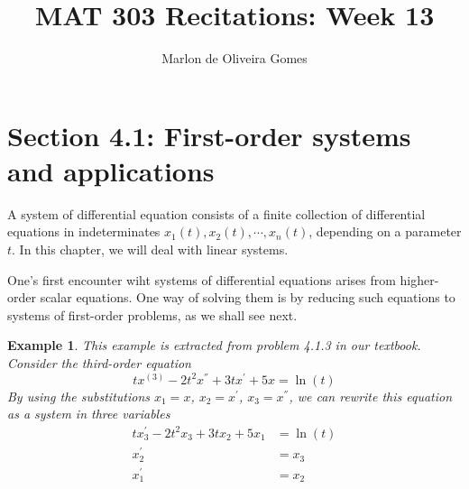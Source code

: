 \documentclass[11pt]{amsart}
\title{MAT 303 Recitations: Week 13}
\author[M. Gomes]{Marlon de Oliveira Gomes}
\newtheorem{example}{Example}
\numberwithin{equation}{section}
\begin{document}
\maketitle


\section*{Section 4.1: First-order systems and applications}

A system of differential equation consists of a finite collection of differential equations in indeterminates $x_1(t), x_2(t), \cdots, x_n(t)$, depending on a parameter $t$. In this chapter, we will deal with linear systems. 

One's first encounter wiht systems of differential equations arises from higher-order scalar equations. One way of solving them is by reducing such equations to systems of first-order problems, as we shall see next. 

\begin{example}
This example is extracted from problem 4.1.3 in our textbook. Consider the third-order equation
\begin{equation*}
tx^{(3)}-2t^2x^{''}+3tx^{'}+5x=\ln(t)
\end{equation*}
By using the substitutions $x_1=x$, $x_2=x^{'}$, $x_3=x^{''}$, we can rewrite this equation as a system in three variables
\begin{align*}
tx_{3}^{'}-2t^2x_3+3tx_2+5x_1 & = \ln(t) \\
x_{2}^{'} & = x_3\\
x_1^{'} & = x_2
\end{align*}
\end{example}
\end{document}
